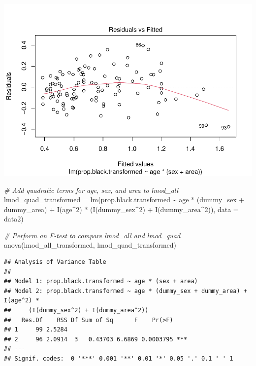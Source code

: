 \documentclass[
]{article}
\newenvironment{Shaded}{\begin{snugshade}}{\end{snugshade}}
\newcommand{\AttributeTok}[1]{\textcolor[rgb]{0.77,0.63,0.00}{#1}}
\newcommand{\CommentTok}[1]{\textcolor[rgb]{0.56,0.35,0.01}{\textit{#1}}}
\newcommand{\DecValTok}[1]{\textcolor[rgb]{0.00,0.00,0.81}{#1}}
\newcommand{\FunctionTok}[1]{\textcolor[rgb]{0.00,0.00,0.00}{#1}}
\newcommand{\NormalTok}[1]{#1}
\newcommand{\OtherTok}[1]{\textcolor[rgb]{0.56,0.35,0.01}{#1}}
\newcommand{\SpecialCharTok}[1]{\textcolor[rgb]{0.00,0.00,0.00}{#1}}
\begin{document}
\includegraphics{code_files/figure-latex/unnamed-chunk-25-1.pdf}

\begin{Shaded}
\begin{Highlighting}[]
\CommentTok{\# Add quadratic terms for age, sex, and area to lmod\_all}
\NormalTok{lmod\_quad\_transformed }\OtherTok{=} \FunctionTok{lm}\NormalTok{(prop.black.transformed }\SpecialCharTok{\textasciitilde{}}\NormalTok{ age }\SpecialCharTok{*}\NormalTok{ (dummy\_sex }\SpecialCharTok{+}\NormalTok{ dummy\_area) }\SpecialCharTok{+} \FunctionTok{I}\NormalTok{(age}\SpecialCharTok{\^{}}\DecValTok{2}\NormalTok{) }\SpecialCharTok{*}\NormalTok{ (}\FunctionTok{I}\NormalTok{(dummy\_sex}\SpecialCharTok{\^{}}\DecValTok{2}\NormalTok{) }\SpecialCharTok{+} \FunctionTok{I}\NormalTok{(dummy\_area}\SpecialCharTok{\^{}}\DecValTok{2}\NormalTok{)), }\AttributeTok{data =}\NormalTok{ data2)}

\CommentTok{\# Perform an F{-}test to compare lmod\_all and lmod\_quad}
\FunctionTok{anova}\NormalTok{(lmod\_all\_transformed, lmod\_quad\_transformed)}
\end{Highlighting}
\end{Shaded}

\begin{verbatim}
## Analysis of Variance Table
## 
## Model 1: prop.black.transformed ~ age * (sex + area)
## Model 2: prop.black.transformed ~ age * (dummy_sex + dummy_area) + I(age^2) * 
##     (I(dummy_sex^2) + I(dummy_area^2))
##   Res.Df    RSS Df Sum of Sq      F    Pr(>F)    
## 1     99 2.5284                                  
## 2     96 2.0914  3   0.43703 6.6869 0.0003795 ***
## ---
## Signif. codes:  0 '***' 0.001 '**' 0.01 '*' 0.05 '.' 0.1 ' ' 1
\end{verbatim}
\end{document}
